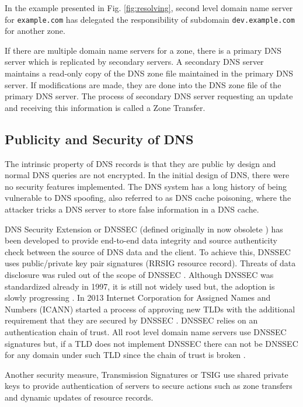 In the example presented in Fig. \ref{fig:resolving}, second level domain name server for \texttt{example.com} has delegated the responsibility of subdomain \texttt{dev.example.com} for another zone.

If there are multiple domain name servers for a zone, there is a primary DNS server which is replicated by secondary servers. A secondary DNS server maintains a read-only copy of the DNS zone file maintained in the primary DNS server. If modifications are made, they are done into the DNS zone file of the primary DNS server. The process of secondary DNS server requesting an update and receiving this information is called a Zone Transfer. \citep{tanenbaum}

\subsection{Publicity and Security of DNS}
\label{sec:dns_security}


The intrinsic property of DNS records is that they are public by design and normal DNS queries are not encrypted. In the initial design of DNS, there were no security features implemented. The DNS system has a long history of being vulnerable to DNS spoofing, also referred to as DNS cache poisoning, where the attacker tricks a DNS server to store false information in a DNS cache. \cite{tanenbaum}\cite{RFC_threat_analysis} 

DNS Security Extension or \textsf{DNSSEC} (defined originally in now obsolete \cite{RFC_2065}) has been developed to provide end-to-end data integrity and source authenticity check between the source of DNS data and the client. To achieve this, DNSSEC uses public/private key pair signatures (\textsf{RRSIG} resource record). Threats of data disclosure was ruled out of the scope of DNSSEC \cite{RFC_threat_analysis}. Although DNSSEC was standardized already in 1997, it is still not widely used but, the adoption is slowly progressing \cite{lotr}. In 2013 Internet Corporation for Assigned Names and Numbers (ICANN) started a process of approving new TLDs with the additional requirement that they are secured by DNSSEC \cite{sweden}. DNSSEC relies on an authentication chain of trust. All root level domain name servers use DNSSEC signatures but, if a TLD does not implement DNSSEC there can not be DNSSEC for any domain under such TLD since the chain of trust is broken \cite{lotr}.

Another security measure, Transmission Signatures or \textsf{TSIG} \cite{RFC_2845_trans_sec} use shared private keys to provide authentication of servers to secure actions such as zone transfers and dynamic updates of resource records.



